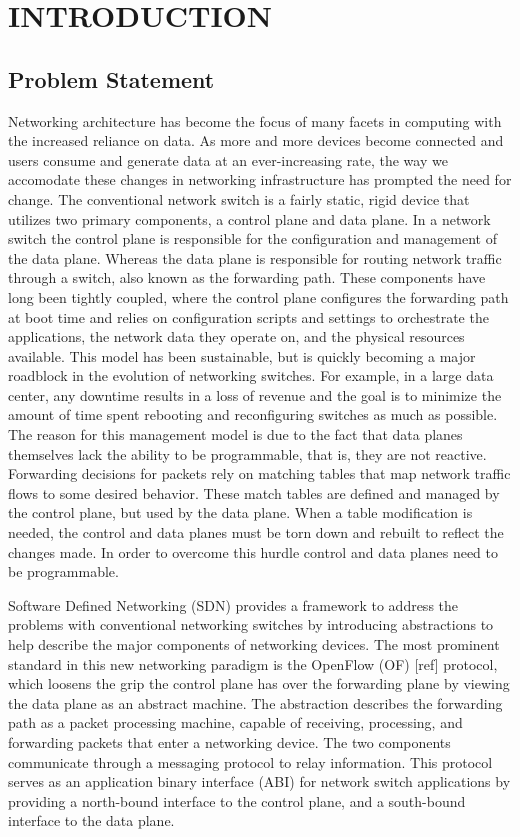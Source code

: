 \chapter{INTRODUCTION}
\label{intro}



\section{Problem Statement}

Networking architecture has become the focus of many facets in computing
with the increased reliance on data. As more and more devices become connected
and users consume and generate data at an ever-increasing rate, the way we
accomodate these changes in networking infrastructure has prompted the need
for change. The conventional network switch is a fairly static, rigid device
that utilizes two primary components, a control plane and data plane. In a
network switch the control plane is responsible for the configuration and
management of the data plane. Whereas the data plane is responsible for routing
network traffic through a switch, also known as the forwarding path. These
components have long been tightly coupled, where the control plane configures 
the forwarding path at boot time and relies on configuration scripts and
settings to orchestrate the applications, the network data they operate on, 
and the physical resources available. This model has been sustainable, but is 
quickly becoming a major roadblock in the evolution of networking switches. 
For example, in a large data center, any downtime results in a loss of revenue 
and the goal is to minimize the amount of time spent rebooting and
reconfiguring switches as much as possible. The reason for this management
model is due to the fact that data planes themselves lack the ability to be
programmable, that is, they are not reactive. Forwarding decisions for packets
rely on matching tables that map network traffic flows to some desired 
behavior. These match tables are defined and managed by the control plane, but
used by the data plane. When a table modification is needed, the control and
data planes must be torn down and rebuilt to reflect the changes made. In
order to overcome this hurdle control and data planes need to be programmable.

Software Defined Networking (SDN) provides a framework to address the
problems with conventional networking switches by introducing abstractions
to help describe the major components of networking devices. The most prominent
standard in this new networking paradigm is the OpenFlow (OF) [ref] protocol,
which loosens the grip the control plane has over the forwarding plane by 
viewing the data plane as an abstract machine. The abstraction describes the 
forwarding path as a packet processing machine, capable of receiving,
processing, and forwarding packets that enter a networking device. The two 
components communicate through a messaging protocol to relay information. This
protocol serves as an application binary interface (ABI) for network switch 
applications by providing a north-bound interface to the control plane, and a 
south-bound interface to the data plane.


